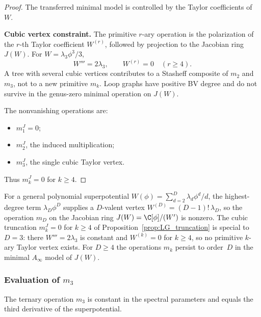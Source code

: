 \begin{proof}
The transferred minimal model is controlled by the Taylor coefficients
of \(W\).

\textbf{Cubic vertex constraint.} The primitive \(r\)-ary operation is
the polarization of the \(r\)-th Taylor coefficient \(W^{(r)}\), followed
by projection to the Jacobian ring \(J(W)\). For
\(W=\lambda_3\phi^3/3\),
\[
W'''=2\lambda_3,\qquad W^{(r)}=0\quad(r\geq4).
\]
A tree with several cubic vertices contributes to a Stasheff composite
of \(m_2\) and \(m_3\), not to a new primitive \(m_k\). Loop graphs have
positive BV degree and do not survive in the genus-zero minimal
operation on \(J(W)\).

The nonvanishing operations are:
\begin{itemize}
\item \(m_1^{J}=0\);
\item \(m_2^{J}\), the induced multiplication;
\item \(m_3^{J}\), the single cubic Taylor vertex.
\end{itemize}
Thus \(m_k^{J}=0\) for \(k\geq4\).
\end{proof}

\begin{remark}
For a general polynomial superpotential $W(\phi) = \sum_{d=2}^D \lambda_d \phi^d/d$, the highest-degree term $\lambda_D\phi^D$ supplies a $D$-valent vertex $W^{(D)} = (D-1)!\,\lambda_D$, so the operation $m_D$ on the Jacobian ring $J(W) = \C[\phi]/(W')$ is nonzero. The cubic truncation \(m_{k}^{J}=0\) for \(k\geq4\) of Proposition~\ref{prop:LG_truncation} is special to \(D=3\): there \(W'''=2\lambda_3\) is constant and \(W^{(k)}=0\) for \(k\geq4\), so no primitive \(k\)-ary Taylor vertex exists. For $D \ge 4$ the operations $m_k$ persist to order~$D$ in the minimal $A_\infty$ model of $J(W)$.
\end{remark}

\subsubsection{Evaluation of $m_3$}

The ternary operation $m_3$ is constant in the spectral parameters and equals the third derivative of the superpotential.

